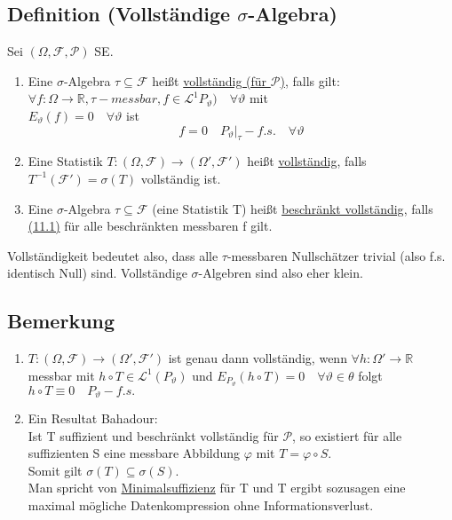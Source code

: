 \documentclass[german,10pt,oneside, fleqn, a4paper]{article}
\newcommand {\R}	{\mathbb{R}}
\newcommand{\ra}{\rightarrow}
\newcommand{\brc}[1]{\left(#1\right)}
\newcommand{\mc}[1]{\mathcal{#1}}
\newcommand{\lp}[1]{\mc{L}^{#1}}
\newcommand{\1}[1]{1_{#1}}
\newcommand{\2}[1]{\1{\brac{#1}}}
\newcommand{\rraum}{\brc{\Omega,\mc{F},\mc{P}}}
\newcommand{\f}{\mc{F}}
\newcommand{\p}{\mc{P}}
\begin{document}
\subsection{Definition (Vollständige $\sigma$-Algebra)}
\label{11.5}
Sei $\rraum$ SE.\begin{enumerate}[label=(\alph*)]
\item Eine $\sigma$-Algebra $\tau\subseteq\f$ heißt \underline{vollständig (für $\p$)}, falls gilt:\\
$\forall f:\Omega\ra\R, \tau-messbar, f\in\lp{1}P_\vartheta)\quad \forall\vartheta$ mit \\
$E_\vartheta(f)=0\quad\forall\vartheta$ ist\[
f=0\quad P_\vartheta\vert_\tau-f.s.\quad\forall\vartheta\]
\item Eine Statistik $T:(\Omega,\f)\ra(\Omega',\f')$ heißt \underline{vollständig}, falls  $T^{-1}(\f')=\sigma(T)$ vollständig ist.
\item Eine $\sigma$-Algebra $\tau\subseteq\f$ (eine Statistik T) heißt \underline{beschränkt vollständig}, falls \hyperref[11.1]{(11.1)} für alle beschränkten messbaren f gilt.
\end{enumerate}
Vollständigkeit bedeutet also, dass alle $\tau$-messbaren Nullschätzer trivial (also f.s. identisch Null) sind. Vollständige $\sigma$-Algebren sind also eher klein.

\subsection{Bemerkung}
\label{11.6}
\begin{enumerate}[label=(\roman*)]
\item $T:(\Omega,\f)\ra(\Omega',\f')$ ist genau dann vollständig, wenn $\forall h:\Omega'\ra\R$ messbar mit $h\circ T\in\lp{1}(P_\vartheta)$ und $E_{P_\vartheta}(h\circ T)=0\quad\forall\vartheta\in\theta$ folgt $h\circ T\equiv0\quad P_\vartheta-f.s.$
\item Ein Resultat Bahadour:\\
Ist T suffizient und beschränkt vollständig für $\mc{P}$, so existiert für alle suffizienten S eine messbare Abbildung $\varphi$ mit $T=\varphi\circ S$.\\
Somit gilt $\sigma(T)\subseteq\sigma(S)$.\\
Man spricht von \underline{Minimalsuffizienz} für T und T ergibt sozusagen eine maximal mögliche Datenkompression ohne Informationsverlust.
\end{enumerate}
\end{document}
